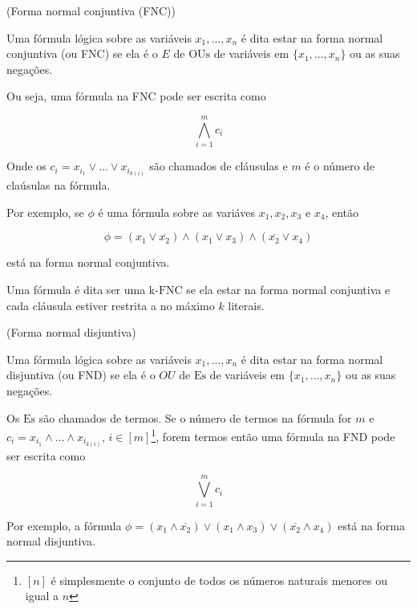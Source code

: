 \begin{defi} (Forma normal conjuntiva (FNC))

Uma fórmula lógica sobre as variáveis $x_{1}, \dots , x_{n}$ é dita estar na forma normal conjuntiva (ou FNC) se ela é o $E$ de $\text{OUs}$ de variáveis em $\{x_{1}, \dots, x_{n}\}$ ou as suas negações.

Ou seja, uma fórmula na FNC pode ser escrita como

\begin{equation*}
\bigwedge_{i = 1}^{m} c_{i}
\end{equation*}

Onde os $c_{i} = x_{i_{1}} \lor \dots \lor x_{i_{k(i)}}$ são chamados de cláusulas e $m$ é o número de claúsulas na fórmula.

\end{defi}

Por exemplo, se $\phi$ é uma fórmula sobre as variáves $x_{1}, x_{2}, x_{3} \text{ e } x_{4}$, então

\begin{equation*}
\phi = (x_{1} \lor \overline{x_{2}}) \land (x_{1} \lor x_{3}) \land (\overline{x_{2}} \lor x_{4})
\end{equation*}

está na forma normal conjuntiva.

Uma fórmula é dita ser uma $\text{k-FNC}$ se ela estar na forma normal conjuntiva e cada cláusula estiver restrita a no máximo $k$ literais.

\begin{defi} (Forma normal disjuntiva)

Uma fórmula lógica sobre as variáveis $x_{1}, \dots , x_{n}$ é dita estar na forma normal disjuntiva (ou FND) se ela é o $OU$ de $\text{Es}$ de variáveis em $\{x_{1}, \dots , x_{n}\}$ ou as suas negações.

Os $\text{Es}$ são chamados de termos. Se o número de termos na fórmula for $m$ e \linebreak $c_{i} = x_{i_{1}} \land \dots \land x_{i_{k(i)}}$, $i \in [m]$\footnote{$[n]$ é simplesmente o conjunto de todos os números naturais menores ou igual a $n$}, forem termos então uma fórmula na FND pode ser escrita como

\begin{equation*}
\bigvee_{i = 1}^{m} c_{i}
\end{equation*}

\end{defi}

Por exemplo, a fórmula $\phi = (x_{1} \land \overline{x_{2}}) \lor (x_{1} \land x_{3}) \lor (\overline{x_{2}} \land x_{4})$ está na forma normal disjuntiva.

